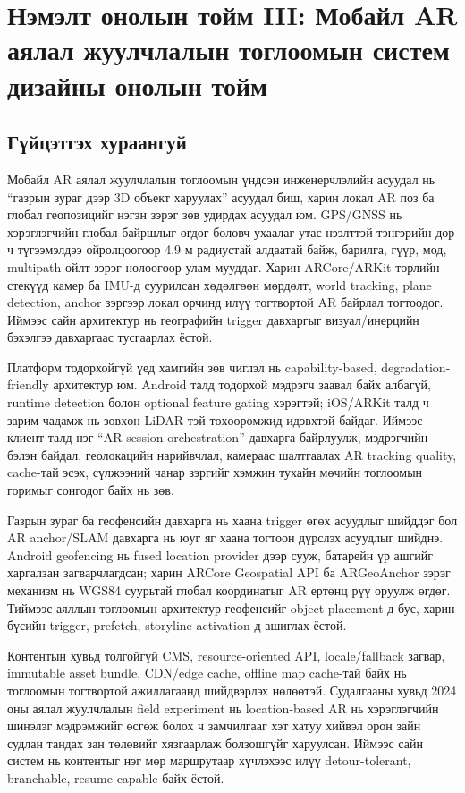 \section{Нэмэлт онолын тойм III: Мобайл AR аялал жуулчлалын тоглоомын систем дизайны онолын тойм}
\begin{sloppy}

\section*{Гүйцэтгэх хураангуй}

Мобайл AR аялал жуулчлалын тоглоомын үндсэн инженерчлэлийн асуудал нь ``газрын зураг дээр 3D объект харуулах'' асуудал биш, харин локал AR поз ба глобал геопозицийг нэгэн зэрэг зөв удирдах асуудал юм. GPS/GNSS нь хэрэглэгчийн глобал байршлыг өгдөг боловч ухаалаг утас нээлттэй тэнгэрийн дор ч түгээмэлдээ ойролцоогоор 4.9 м радиустай алдаатай байж, барилга, гүүр, мод, multipath ойлт зэрэг нөлөөгөөр улам мууддаг. Харин ARCore/ARKit төрлийн стекүүд камер ба IMU-д суурилсан хөдөлгөөн мөрдөлт, world tracking, plane detection, anchor зэргээр локал орчинд илүү тогтвортой AR байрлал тогтоодог. Иймээс сайн архитектур нь географийн trigger давхаргыг визуал/инерцийн бэхэлгээ давхаргаас тусгаарлах ёстой.

Платформ тодорхойгүй үед хамгийн зөв чиглэл нь capability-based, degradation-friendly архитектур юм. Android талд тодорхой мэдрэгч заавал байх албагүй, runtime detection болон optional feature gating хэрэгтэй; iOS/ARKit талд ч зарим чадамж нь зөвхөн LiDAR-тэй төхөөрөмжид идэвхтэй байдаг. Иймээс клиент талд нэг ``AR session orchestration'' давхарга байрлуулж, мэдрэгчийн бэлэн байдал, геолокацийн нарийвчлал, камераас шалтгаалах AR tracking quality, cache-тай эсэх, сүлжээний чанар зэргийг хэмжин тухайн мөчийн тоглоомын горимыг сонгодог байх нь зөв.

Газрын зураг ба геофенсийн давхарга нь хаана trigger өгөх асуудлыг шийддэг бол AR anchor/SLAM давхарга нь юуг яг хаана тогтоон дүрслэх асуудлыг шийднэ. Android geofencing нь fused location provider дээр сууж, батарейн үр ашгийг харгалзан загварчлагдсан; харин ARCore Geospatial API ба ARGeoAnchor зэрэг механизм нь WGS84 суурьтай глобал координатыг AR ертөнц рүү оруулж өгдөг. Тиймээс аяллын тоглоомын архитектур геофенсийг object placement-д бус, харин бүсийн trigger, prefetch, storyline activation-д ашиглах ёстой.

Контентын хувьд толгойгүй CMS, resource-oriented API, locale/fallback загвар, immutable asset bundle, CDN/edge cache, offline map cache-тай байх нь тоглоомын тогтвортой ажиллагаанд шийдвэрлэх нөлөөтэй. Судалгааны хувьд 2024 оны аялал жуулчлалын field experiment нь location-based AR нь хэрэглэгчийн шинэлэг мэдрэмжийг өсгөж болох ч замчилгааг хэт хатуу хийвэл орон зайн судлан тандах зан төлөвийг хязгаарлаж болзошгүйг харуулсан. Иймээс сайн систем нь контентыг нэг мөр маршрутаар хүчлэхээс илүү detour-tolerant, branchable, resume-capable байх ёстой.


\end{sloppy}
